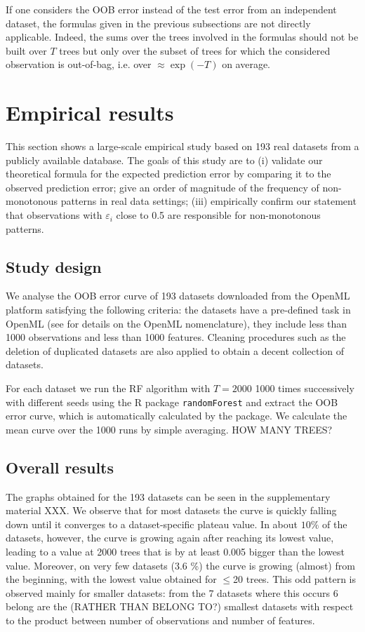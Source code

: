 \documentclass[paper=a4
               ,12pt
               ,DIV=12
               ,parskip=half
               ,titlepage=on
               ,headinclude 
               ,footinclude
               ,headsepline
               ,footsepline         %
               ,ilines 
               ]{scrartcl}
\begin{document}
If one considers the OOB error instead of the test error from an independent dataset, the formulas given in the previous subsections are not directly applicable.
Indeed, the sums over the trees involved in the formulas should not be built over $T$ trees but only over the subset of trees for which the considered observation is out-of-bag, i.e. over $\approx\exp (-T)$ on average.

\section{Empirical results}
\label{sec:empirical}

This section shows a large-scale empirical study based on 193 real datasets from a publicly available database. The goals of this study are to (i) validate our theoretical formula for the expected prediction error by comparing it to the observed prediction error; give an order of magnitude of the frequency of non-monotonous patterns in real data settings; (iii) empirically confirm our statement that observations with $\varepsilon_i$ close to 0.5 are responsible for non-monotonous patterns. 

\subsection{Study design}
We analyse the OOB error curve of 193 datasets downloaded from the OpenML platform \citep{OpenML2013} satisfying the following criteria: the datasets have a pre-defined task in OpenML (see \citet{OpenML2013} for details on the OpenML nomenclature), they include less than 1000 observations and less than 1000 features. Cleaning procedures such as the deletion of duplicated datasets are also applied to obtain a decent collection of datasets. 

For each dataset we run the RF algorithm with $T=2000$ 1000 times successively with different seeds using the R package \texttt{randomForest} \citep{Liaw2002} and extract the OOB error curve, which is automatically calculated by the package. 
We calculate the mean curve over the 1000 runs by simple averaging. HOW MANY TREES?

\subsection{Overall results}
The graphs obtained for the 193 datasets can be seen in the supplementary material XXX. 
We observe that for most datasets the curve is quickly falling down until it converges to a dataset-specific plateau value. In about $10\%$ of the datasets, however, the curve is growing again after reaching its lowest value, leading to a value at 2000 trees that is by at least 0.005 bigger than the lowest value. Moreover, on very few datasets (3.6 \%) the curve is growing (almost) from the beginning, with the lowest value obtained for $\leq$20 trees. This odd pattern is observed mainly for smaller datasets: from the 7 datasets where this occurs 6 belong are the (RATHER THAN BELONG TO?) smallest datasets with respect to the product between number of observations and number of features. 
\end{document}
